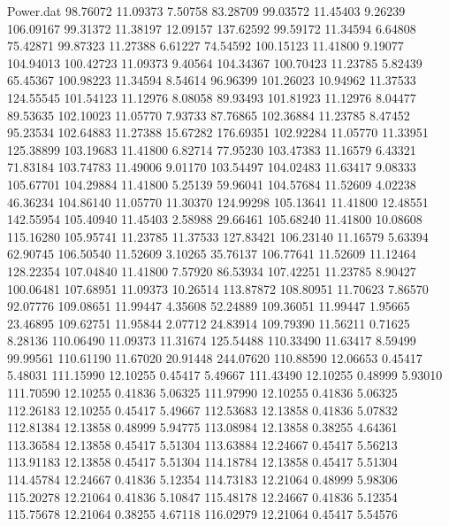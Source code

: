 \begin{filecontents}{Power.dat}
  98.76072   11.09373    7.50758   83.28709
  99.03572   11.45403    9.26239  106.09167
  99.31372   11.38197   12.09157  137.62592
  99.59172   11.34594    6.64808   75.42871
  99.87323   11.27388    6.61227   74.54592
 100.15123   11.41800    9.19077  104.94013
 100.42723   11.09373    9.40564  104.34367
 100.70423   11.23785    5.82439   65.45367
 100.98223   11.34594    8.54614   96.96399
 101.26023   10.94962   11.37533  124.55545
 101.54123   11.12976    8.08058   89.93493
 101.81923   11.12976    8.04477   89.53635
 102.10023   11.05770    7.93733   87.76865
 102.36884   11.23785    8.47452   95.23534
 102.64883   11.27388   15.67282  176.69351
 102.92284   11.05770   11.33951  125.38899
 103.19683   11.41800    6.82714   77.95230
 103.47383   11.16579    6.43321   71.83184
 103.74783   11.49006    9.01170  103.54497
 104.02483   11.63417    9.08333  105.67701
 104.29884   11.41800    5.25139   59.96041
 104.57684   11.52609    4.02238   46.36234
 104.86140   11.05770   11.30370  124.99298
 105.13641   11.41800   12.48551  142.55954
 105.40940   11.45403    2.58988   29.66461
 105.68240   11.41800   10.08608  115.16280
 105.95741   11.23785   11.37533  127.83421
 106.23140   11.16579    5.63394   62.90745
 106.50540   11.52609    3.10265   35.76137
 106.77641   11.52609   11.12464  128.22354
 107.04840   11.41800    7.57920   86.53934
 107.42251   11.23785    8.90427  100.06481
 107.68951   11.09373   10.26514  113.87872
 108.80951   11.70623    7.86570   92.07776
 109.08651   11.99447    4.35608   52.24889
 109.36051   11.99447    1.95665   23.46895
 109.62751   11.95844    2.07712   24.83914
 109.79390   11.56211    0.71625    8.28136
 110.06490   11.09373   11.31674  125.54488
 110.33490   11.63417    8.59499   99.99561
 110.61190   11.67020   20.91448  244.07620
 110.88590   12.06653    0.45417    5.48031
 111.15990   12.10255    0.45417    5.49667
 111.43490   12.10255    0.48999    5.93010
 111.70590   12.10255    0.41836    5.06325
 111.97990   12.10255    0.41836    5.06325
 112.26183   12.10255    0.45417    5.49667
 112.53683   12.13858    0.41836    5.07832
 112.81384   12.13858    0.48999    5.94775
 113.08984   12.13858    0.38255    4.64361
 113.36584   12.13858    0.45417    5.51304
 113.63884   12.24667    0.45417    5.56213
 113.91183   12.13858    0.45417    5.51304
 114.18784   12.13858    0.45417    5.51304
 114.45784   12.24667    0.41836    5.12354
 114.73183   12.21064    0.48999    5.98306
 115.20278   12.21064    0.41836    5.10847
 115.48178   12.24667    0.41836    5.12354
 115.75678   12.21064    0.38255    4.67118
 116.02979   12.21064    0.45417    5.54576

\end{filecontents}

